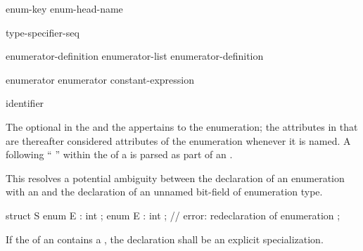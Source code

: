 \begin{bnf}
\br
    enum-key  enum-head-name  \terminal{;}
\end{bnf}

\begin{bnf}
\br
    \br
     \br
     
\end{bnf}

\begin{bnf}
\br
    \terminal{:} type-specifier-seq
\end{bnf}

\begin{bnf}
\br
    enumerator-definition\br
    enumerator-list \terminal{,} enumerator-definition
\end{bnf}

\begin{bnf}
\br
    enumerator\br
    enumerator \terminal{=} constant-expression
\end{bnf}

\begin{bnf}
\br
    identifier 
\end{bnf}

The optional  in the  and
the  appertains to the enumeration; the attributes
in that  are thereafter considered attributes of the
enumeration whenever it is named.
A \tcode{:} following
``  ''
within the  of a 
is parsed as part of an .
\begin{note} This resolves a potential ambiguity between the declaration of an enumeration
with an  and the declaration of an unnamed bit-field of enumeration
type. \begin{example}

\begin{codeblock}
   struct S {
     enum E : int {};
     enum E : int {};           // error: redeclaration of enumeration
   };
\end{codeblock}

\end{example}
\end{note}
If the  of an  contains
a ,
the declaration shall be an explicit specialization.

